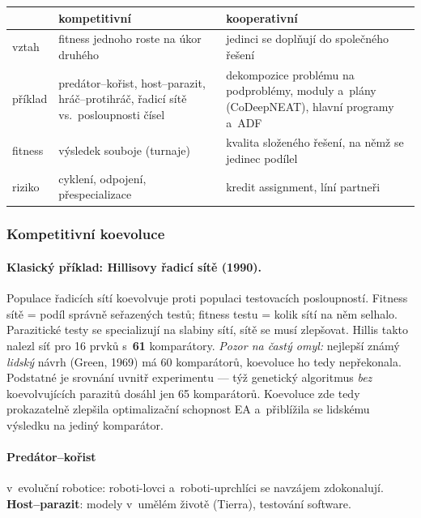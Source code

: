 \documentclass[11pt,a4paper]{article}
\theoremstyle{definition}
\begin{document}
\begin{center}
\begin{tabular}{@{}p{3cm}p{6cm}p{6cm}@{}}
\toprule
 & \textbf{kompetitivní} & \textbf{kooperativní} \\
\midrule
vztah & fitness jednoho roste na úkor druhého & jedinci se doplňují do
  společného řešení \\
příklad & predátor--kořist, host--parazit, hráč--protihráč, řadicí sítě vs.\
  posloupnosti čísel & dekompozice problému na podproblémy, moduly a~plány
  (CoDeepNEAT), hlavní programy a~ADF \\
fitness & výsledek souboje (turnaje) & kvalita složeného řešení, na němž se
  jedinec podílel \\
riziko & cyklení, odpojení, přespecializace & kredit assignment, líní partneři \\
\bottomrule
\end{tabular}
\end{center}

\subsubsection{Kompetitivní koevoluce}

\paragraph{Klasický příklad: Hillisovy řadicí sítě (1990).} Populace řadicích
sítí koevolvuje proti populaci testovacích posloupností. Fitness sítě = podíl
správně seřazených testů; fitness testu = kolik sítí na něm selhalo. Parazitické
testy se specializují na slabiny sítí, sítě se musí zlepšovat. Hillis takto
nalezl síť pro 16 prvků s~\textbf{61} komparátory. \emph{Pozor na častý omyl:}
nejlepší známý \emph{lidský} návrh (Green, 1969) má 60 komparátorů, koevoluce
ho tedy nepřekonala. Podstatné je srovnání uvnitř experimentu --- týž genetický
algoritmus \emph{bez} koevolvujících parazitů dosáhl jen 65 komparátorů.
Koevoluce zde tedy prokazatelně zlepšila optimalizační schopnost EA a~přiblížila
se lidskému výsledku na jediný komparátor.

\paragraph{Predátor--kořist} v~evoluční robotice: roboti-lovci a~roboti-uprchlíci
se navzájem zdokonalují. \textbf{Host--parazit}: modely v~umělém životě
(Tierra), testování software.
\end{document}
